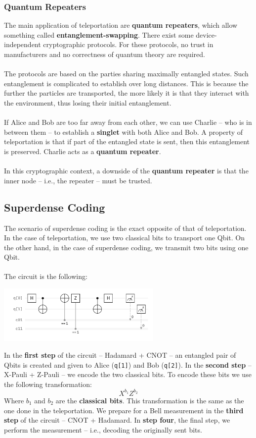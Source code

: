 \documentclass{article}
\begin{document}
\subsubsection{Quantum Repeaters}
The main application of teleportation are \textbf{quantum repeaters}, which allow something called \textbf{entanglement-swapping}. There exist some device-independent cryptographic protocols. For these protocols, no trust in manufacturers and no correctness of quantum theory are required. \\ \\
The protocols are based on the parties sharing maximally entangled states. Such entanglement is complicated to establish over long distances. This is because the further the particles are transported, the more likely it is that they interact with the environment, thus losing their initial entanglement. \\ \\
If Alice and Bob are too far away from each other, we can use Charlie -- who is in between them -- to establish a \textbf{singlet} with both Alice and Bob. A property of teleportation is that if part of the entangled state is sent, then this entanglement is preserved. Charlie acts as a \textbf{quantum repeater}. \\ \\
In this cryptographic context, a downside of the \textbf{quantum repeater} is that the inner node -- i.e., the repeater -- must be trusted.

\subsection{Superdense Coding}
The scenario of superdense coding is the exact opposite of that of teleportation. In the case of teleportation, we use two classical bits to transport one Qbit. On the other hand, in the case of superdense coding, we transmit two bits using one Qbit. \\ \\
The circuit is the following:
\begin{center}
	\includegraphics[width=8cm]{assets/superdense_circuit.png}
\end{center}
In the \textbf{first step} of the circuit -- Hadamard + CNOT -- an entangled pair of Qbits is created and given to Alice (\verb|q[1]|) and Bob (\verb|q[2]|). In the \textbf{second step} -- X-Pauli + Z-Pauli -- we encode the two classical bits. To encode these bits we use the following transformation:
\[ X^{b_1}Z^{b_2} \]
Where $b_1$ and $b_2$ are the \textbf{classical bits}. This transformation is the same as the one done in the teleportation. We prepare for a Bell measurement in the \textbf{third step} of the circuit -- CNOT + Hadamard. In \textbf{step four}, the final step, we perform the measurement -- i.e., decoding the originally sent bits.
\end{document}
